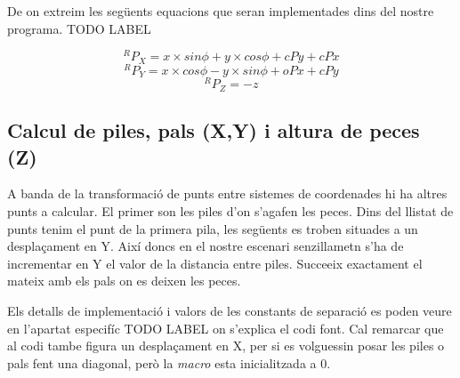 De on extreim les següents equacions que seran implementades dins del
nostre programa. TODO LABEL

$$^RP_X = x\times sin \phi + y \times cos \phi + cPy + cPx$$
$$^RP_Y = x\times cos \phi - y \times sin \phi + oPx + cPy$$
$$^RP_Z = -z$$

\subsection{Calcul de piles, pals (X,Y) i altura de peces (Z)}
A banda de la transformació de punts entre sistemes de coordenades hi ha altres punts a calcular.
El primer son les piles d'on s'agafen les peces. Dins del llistat de punts tenim el punt de la primera
pila, les següents es troben situades a un desplaçament en Y. Així doncs en el nostre escenari
senzillametn s'ha de incrementar en Y el valor de la distancia entre piles. Succeeix exactament
el mateix amb els pals on es deixen les peces.

Els detalls de implementació i valors de les constants de separació es poden veure en l'apartat
especifíc TODO LABEL on s'explica el codi font. Cal remarcar que al codi tambe figura un
desplaçament en X, per si es volguessin posar les piles o pals fent una diagonal, però la \emph{macro}
esta inicialitzada a 0.





